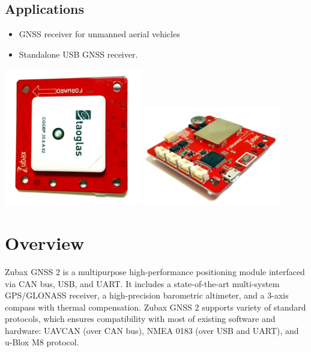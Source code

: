 \documentclass{zubaxdoc}
\begin{document}
\begin{titlepage}
\BeginRightColumn

\section*{Applications}

\begin{itemize}
	\item GNSS receiver for unmanned aerial vehicles
    \item Standalone USB GNSS receiver.
\end{itemize}

\centering
\includegraphics[width=0.45\textwidth]{GNSS_top}
\includegraphics[width=0.45\textwidth]{GNSS_bottom}
\end{titlepage}

\tableofcontents
\BeginRightColumn
\listoffigures
\listoftables

\mainmatter

\chapter{Overview}

Zubax GNSS 2 is a multipurpose high-performance positioning module interfaced via CAN bus, USB, and UART. It includes a state-of-the-art multi-system GPS/GLONASS receiver, a high-precision barometric altimeter, and a 3-axis compass with thermal compensation. Zubax GNSS 2 supports variety of standard protocols, which ensures compatibility with most of existing software and hardware: UAVCAN (over CAN bus), NMEA 0183 (over USB and UART), and u-Blox M8 protocol.
\end{document}
